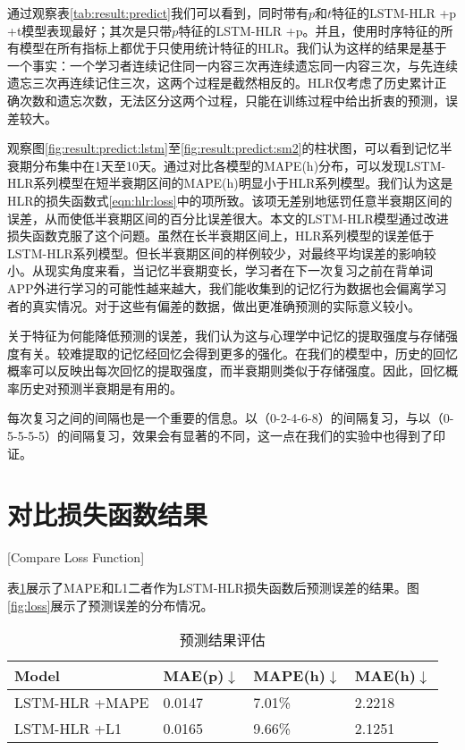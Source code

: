 通过观察表\ref{tab:result:predict}我们可以看到，同时带有$p$和$t$特征的LSTM-HLR +p +t模型表现最好；其次是只带$p$特征的LSTM-HLR +p。并且，使用时序特征的所有模型在所有指标上都优于只使用统计特征的HLR。我们认为这样的结果是基于一个事实：一个学习者连续记住同一内容三次再连续遗忘同一内容三次，与先连续遗忘三次再连续记住三次，这两个过程是截然相反的。HLR仅考虑了历史累计正确次数和遗忘次数，无法区分这两个过程，只能在训练过程中给出折衷的预测，误差较大。

观察图\ref{fig:result:predict:lstm}至\ref{fig:result:predict:sm2}的柱状图，可以看到记忆半衰期分布集中在1天至10天。通过对比各模型的MAPE(h)分布，可以发现LSTM-HLR系列模型在短半衰期区间的MAPE(h)明显小于HLR系列模型。我们认为这是HLR的损失函数式\ref{eqn:hlr:loss}中的项所致。该项无差别地惩罚任意半衰期区间的误差，从而使低半衰期区间的百分比误差很大。本文的LSTM-HLR模型通过改进损失函数克服了这个问题。虽然在长半衰期区间上，HLR系列模型的误差低于LSTM-HLR系列模型。但长半衰期区间的样例较少，对最终平均误差的影响较小。从现实角度来看，当记忆半衰期变长，学习者在下一次复习之前在背单词APP外进行学习的可能性越来越大，我们能收集到的记忆行为数据也会偏离学习者的真实情况。对于这些有偏差的数据，做出更准确预测的实际意义较小。

关于特征为何能降低预测的误差，我们认为这与心理学中记忆的提取强度与存储强度有关。较难提取的记忆经回忆会得到更多的强化\cite{bjorkNewTheoryDisuse1992}。在我们的模型中，历史的回忆概率可以反映出每次回忆的提取强度，而半衰期则类似于存储强度。因此，回忆概率历史对预测半衰期是有用的。

每次复习之间的间隔也是一个重要的信息。以（0-2-4-6-8）的间隔复习，与以（0-5-5-5-5）的间隔复习，效果会有显著的不同\cite{maddoxRoleForgettingRate2011}，这一点在我们的实验中也得到了印证。

\section{对比损失函数结果}[Compare Loss Function]

表\ref{tab:loss}展示了MAPE和L1二者作为LSTM-HLR损失函数后预测误差的结果。图\ref{fig:loss}展示了预测误差的分布情况。

\begin{table}[htbp]
    \caption{预测结果评估}
    \label{tab:loss}
    \vspace{0.5em}\centering\wuhao
    \begin{tabular}{llll}
    \toprule[1.5pt]
    \textbf{Model}  &\textbf{MAE(p)}$\downarrow$ &\textbf{MAPE(h)}$\downarrow$ &\textbf{MAE(h)}$\downarrow$\\
    \midrule[1pt]
    LSTM-HLR +MAPE  &0.0147   &7.01\%   &2.2218\\
    LSTM-HLR +L1    &0.0165   &9.66\%   &2.1251\\
    \bottomrule[1.5pt]
    \end{tabular}
\end{table}

